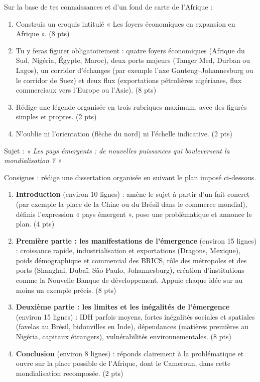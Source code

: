 \documentclass[11pt]{article}
\begin{document}
\begin{exercice}
Sur la base de tes connaissances et d'un fond de carte de l'Afrique :
\begin{enumerate}
\item Construis un croquis intitulé « Les foyers économiques en expansion en Afrique ». (8 pts)
\item Tu y feras figurer obligatoirement : quatre foyers économiques (Afrique du Sud, Nigéria, Égypte, Maroc), deux ports majeurs (Tanger Med, Durban ou Lagos), un corridor d'échanges (par exemple l'axe Gauteng--Johannesburg ou le corridor de Suez) et deux flux (exportations pétrolières nigérianes, flux commerciaux vers l'Europe ou l'Asie). (8 pts)
\item Rédige une légende organisée en trois rubriques maximum, avec des figurés simples et propres. (2 pts)
\item N'oublie ni l'orientation (flèche du nord) ni l'échelle indicative. (2 pts)
\end{enumerate}
\end{exercice}

\begin{exercice}
Sujet : \emph{« Les pays émergents : de nouvelles puissances qui bouleversent la mondialisation ? »}

Consignes : rédige une dissertation organisée en suivant le plan imposé ci-dessous.

\begin{enumerate}
\item \textbf{Introduction} (environ 10 lignes) : amène le sujet à partir d'un fait concret (par exemple la place de la Chine ou du Brésil dans le commerce mondial), définis l'expression « pays émergent », pose une problématique et annonce le plan. (4 pts)
\item \textbf{Première partie : les manifestations de l'émergence} (environ 15 lignes) : croissance rapide, industrialisation et exportations (Dragons, Mexique), poids démographique et commercial des BRICS, rôle des métropoles et des ports (Shanghai, Dubaï, São Paulo, Johannesburg), création d'institutions comme la Nouvelle Banque de développement. Appuie chaque idée sur au moins un exemple précis. (8 pts)
\item \textbf{Deuxième partie : les limites et les inégalités de l'émergence} (environ 15 lignes) : IDH parfois moyens, fortes inégalités sociales et spatiales (favelas au Brésil, bidonvilles en Inde), dépendances (matières premières au Nigéria, capitaux étrangers), vulnérabilités environnementales. (8 pts)
\item \textbf{Conclusion} (environ 8 lignes) : réponds clairement à la problématique et ouvre sur la place possible de l'Afrique, dont le Cameroun, dans cette mondialisation recomposée. (2 pts)
\end{enumerate}
\end{exercice}
\end{document}
